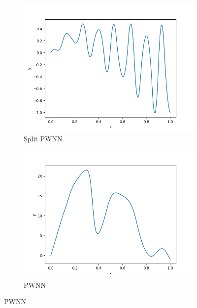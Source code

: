 \begin{figure}[H]
\begin{subfigure}{0.45\textwidth}
        \includegraphics[width=0.9\linewidth]{./pics/final/possion/dgnet1d/15pispwnn.png}  
        \caption{Split PWNN}
    \end{subfigure}  
    \begin{subfigure}{0.5\textwidth}  
        \centering  
        \includegraphics[width=0.9\linewidth]{./pics/final/possion/dgnet1d/15pipwnn.png}  
        \caption{PWNN}
    \end{subfigure} 
\end{figure} 

